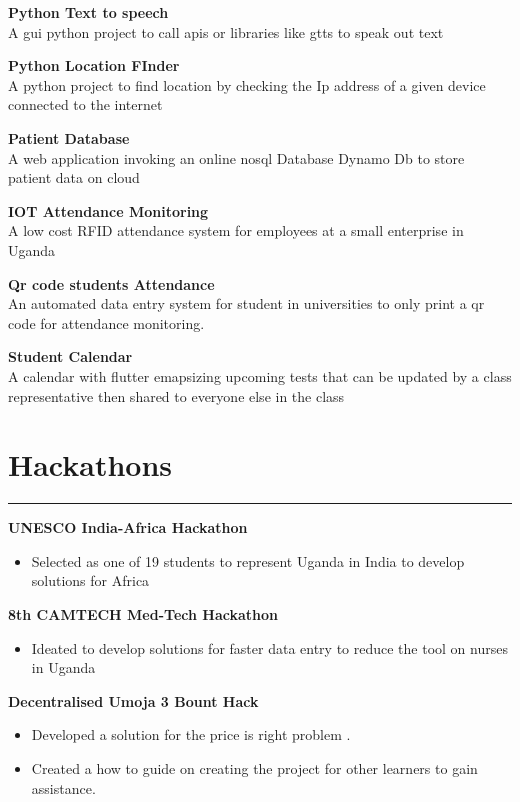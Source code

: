 \documentclass[a4paper]{article}
\begin{document}
\begin{minipage}[t]{0.5\textwidth}
        {\bf Python Text to speech}\\
        A gui python project to call apis or libraries like gtts to speak out text

        {\bf Python Location FInder}\\
        A python project to find location by checking the Ip address of a given device connected to the internet

        {\bf Patient Database}\\
        A web application invoking an online nosql Database Dynamo Db to store patient data on cloud

        {\bf IOT Attendance Monitoring}\\
        A low cost RFID attendance system for employees at a small enterprise in Uganda

        {\bf Qr code students Attendance}\\
        An automated data entry system for student in universities to only print a qr code for attendance monitoring.

        {\bf Student Calendar}\\
        A calendar with flutter emapsizing upcoming tests that can be updated by a class representative then shared to everyone else in the class

        \section*{\bf Hackathons}
        \hrule
        {\bf UNESCO India-Africa Hackathon}

        \begin{itemize}[noitemsep]
            \item Selected as one of 19 students to represent Uganda in India to develop solutions for Africa
        \end{itemize}

        {\bf 8th CAMTECH Med-Tech Hackathon}

        \begin{itemize}
            \itemsep0em
            \item Ideated to develop solutions for faster data entry to reduce the tool on nurses in Uganda
        \end{itemize}
        {\bf Decentralised Umoja 3 Bount Hack}
        \begin{itemize}
            \itemsep0em
            \item Developed a solution for the price is right problem .
            \item Created a how to guide on creating the project for other learners to gain assistance.
        \end{itemize}

\end{minipage}
\end{document}
